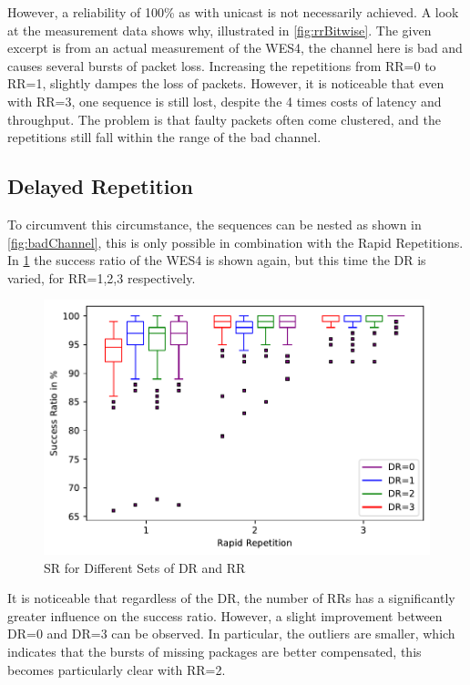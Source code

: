 However, a reliability of 100\% as with unicast is not necessarily achieved.
A look at the measurement data shows why, illustrated in \cref{fig:rrBitwise}.
The given excerpt is from an actual measurement of the WES4, 
the channel here is bad and causes several bursts of packet loss.
Increasing the repetitions from RR=0 to RR=1, slightly dampes the loss of packets.
However, it is noticeable that even with RR=3,
one sequence is still lost, despite the 4 times costs of latency and throughput.
The problem is that faulty packets often come clustered, 
and the repetitions still fall within the range of the bad channel.

\subsection*{Delayed Repetition}

To circumvent this circumstance, the sequences can be nested as shown in \cref{fig:badChannel},
this is only possible in combination with the Rapid Repetitions.
In \cref{fig:sr_dr} the success ratio of the WES4 is shown again,
but this time the DR is varied, for RR=1,2,3 respectively.

\begin{figure}[h]
	\centering
	\includegraphics[scale=0.8]{../Plot2/Graphs/SR_per_DR.pdf}
	\caption{SR for Different Sets of DR and RR}
	\label{fig:sr_dr}
\end{figure}

It is noticeable that regardless of the DR, the number of RRs has a significantly greater influence on the success ratio.
However, a slight improvement between DR=0 and DR=3 can be observed.
In particular, the outliers are smaller, which indicates that the bursts of missing packages are better compensated,
this becomes particularly clear with RR=2.

